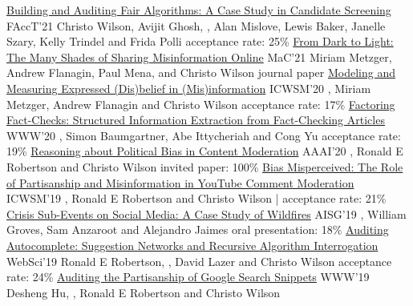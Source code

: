 \documentclass[letterpaper]{awesome-cv}
\begin{document}
\addvspace{0ex}
\begin{cventries}
  \cvpubspecialtwo
    {\href{https://shanjiang.me/publications/facct21_paper.pdf}{Building and Auditing Fair Algorithms: A Case Study in Candidate Screening}}
    {FAccT'21}
    {Christo Wilson, Avijit Ghosh, , Alan Mislove, Lewis Baker, Janelle Szary, Kelly Trindel and Frida Polli}
    {acceptance rate: 25\%}
  \cvpub
    {\href{https://shanjiang.me/publications/mac21_paper.pdf}{From Dark to Light: The Many Shades of Sharing Misinformation Online}}
    {MaC'21}
    {Miriam Metzger, Andrew Flanagin, Paul Mena,  and Christo Wilson}
    {journal paper}
  \cvpub
    {\href{https://shanjiang.me/publications/icwsm20_paper.pdf}{Modeling and Measuring Expressed (Dis)belief in (Mis)information}}
    {ICWSM'20}
    {, Miriam Metzger, Andrew Flanagin and Christo Wilson}
    {acceptance rate: 17\%}
  \cvpub
    {\href{https://shanjiang.me/publications/www20_paper.pdf}{Factoring Fact-Checks: Structured Information Extraction from Fact-Checking Articles}}
    {WWW'20}
    {, Simon Baumgartner, Abe Ittycheriah and Cong Yu}
    {acceptance rate: 19\%}
  \cvpub
    {\href{https://shanjiang.me/publications/aaai20_paper.pdf}{Reasoning about Political Bias in Content Moderation}}
    {AAAI'20}
    {, Ronald E Robertson and Christo Wilson}
    {invited paper: 100\%}
  \cvpubspecial
    {\href{https://shanjiang.me/publications/icwsm19_paper.pdf}{Bias Misperceived: The Role of Partisanship and Misinformation in YouTube Comment Moderation}}
    {ICWSM'19}
    {, Ronald E Robertson and Christo Wilson}
    {  | acceptance rate: 21\%}
  \cvpub
    {\href{https://shanjiang.me/publications/aisg19_paper.pdf}{Crisis Sub-Events on Social Media: A Case Study of Wildfires}}
    {AISG'19}
    {, William Groves, Sam Anzaroot and Alejandro Jaimes}
    {oral presentation: 18\%}
  \cvpub
    {\href{https://shanjiang.me/publications/websci19_paper.pdf}{Auditing Autocomplete: Suggestion Networks and Recursive Algorithm Interrogation}}
    {WebSci'19}
    {Ronald E Robertson, , David Lazer and Christo Wilson}
    {acceptance rate: 24\%}
  \cvpub
    {\href{https://shanjiang.me/publications/www19_paper.pdf}{Auditing the Partisanship of Google Search Snippets}}
    {WWW'19}
    {Desheng Hu, , Ronald E Robertson and Christo Wilson}

\end{cventries}
\end{document}
